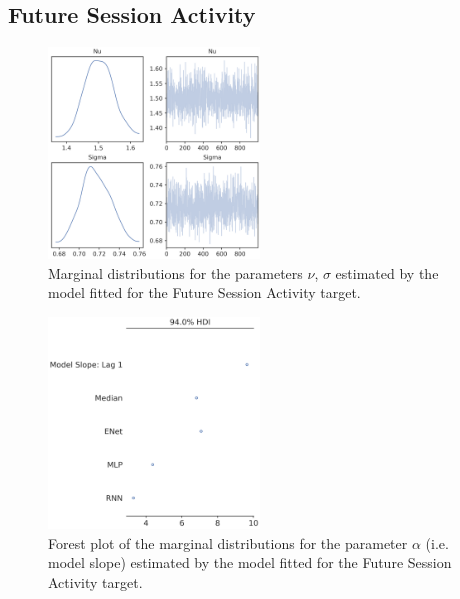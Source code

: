 \subsection{Future Session Activity}
\label{future_acti_bayes_2}

\begin{figure}[H]
\centering
\includegraphics[width=0.5\textwidth]{images/appendix_C/Future Session Activity_marginals_2.png}
\caption[\textbf{Future session activity marginal distributions}]{Marginal distributions for the parameters $\nu$, $\sigma$ estimated by the model fitted for the Future Session Activity target.}
\label{marginals_acti_2}
\end{figure}

\begin{figure}[H]
\centering
\includegraphics[width=0.5\textwidth]{images/appendix_C/Future Session Activity_models_2.png}
\caption[\textbf{Future session activity model fixed effect}]{Forest plot of the marginal distributions for the parameter $\alpha$ (i.e. model slope) estimated by the model fitted for the Future Session Activity target.}
\label{model_acti_2}
\end{figure}

